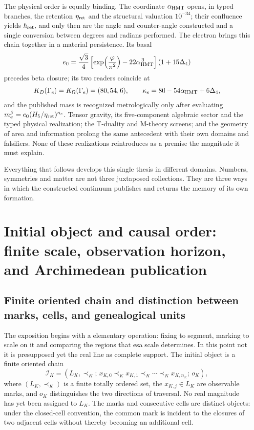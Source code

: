 The physical order is equally binding. The coordinate
\(\alpha_{\rm HMT}\) opens, in typed branches, the retention
\(\eta_{\rm ret}\) and the structural valuation \(10^{-34}\); their confluence
yields \(\hbar_{\rm ret}\), and only then are the angle and
counter-angle constructed and a single conversion between degrees and radians performed. The
electron brings this chain together in a material persistence. Its basal
\[
e_0=
\frac{\sqrt3}{4}
\left[
\exp\!\left(\frac{\varphi}{\pi^2}\right)
-22\alpha_{\rm HMT}^{\,3}
\right](1+15\Delta_4)
\]
precedes beta closure; its two readers coincide at
\[
K_D(\Gamma_e)=K_\Omega(\Gamma_e)=(80,54,6),
\qquad
\kappa_e=80-54\alpha_{\rm HMT}+6\Delta_4,
\]
and the published mass is recognized metrologically only after evaluating
\(m_e^\beta=e_0(H_5/\eta_{\rm ret})^{\kappa_e}\). Tensor gravity, its
five-component algebraic sector and the typed physical realization; the
T-duality and M-theory screens; and the geometry of area and information
prolong the same antecedent with their own domains and falsifiers. None
of these realizations reintroduces as a premise the magnitude it must
explain.

Everything that follows develops this single thesis in different domains. Numbers,
symmetries and matter are not three juxtaposed collections. They are
three ways in which the constructed continuum publishes and returns the memory of
its own formation.

\section{Initial object and causal order: finite scale, observation horizon, and Archimedean publication}

\subsection*{Finite oriented chain and distinction between marks, cells, and genealogical units}

The exposition begins with a elementary operation: fixing to segment,
marking to scale on it and comparing the regions that esa scale determines. In
this point not it is presupposed yet the real line as complete support. The
initial object is a finite oriented chain
\[
 \mathcal I_K=(L_K,\prec_K;\,
 x_{K,0}\prec_K x_{K,1}\prec_K\cdots\prec_K x_{K,n_K};\,o_K),
\]
where \((L_K,\prec_K)\) is a finite totally ordered set, the
\(x_{K,j}\in L_K\) are observable marks, and \(o_K\) distinguishes the two
directions of traversal. No real magnitude has yet been assigned to \(L_K\).
The marks and consecutive cells are distinct objects: under the
closed-cell convention, the common mark is incident to the closures
of two adjacent cells without thereby becoming an additional cell.


